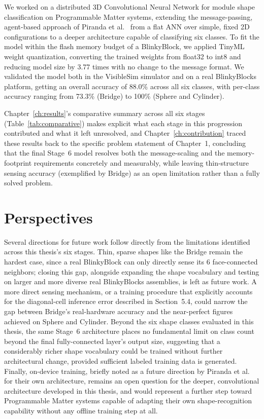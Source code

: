 \documentclass[12pt,a4paper]{report}
\begin{document}
We worked on a distributed 3D Convolutional Neural Network for module shape classification on Programmable Matter systems, extending the message-passing, agent-based approach of Piranda et al.~\cite{piranda2024ai4pm} from a flat ANN over simple, fixed 2D configurations to a deeper architecture capable of classifying six classes. To fit the model within the flash memory budget of a BlinkyBlock, we applied TinyML weight quantization, converting the trained weights from float32 to int8 and reducing model size by 3.77 times with no change to the message format. We validated the model both in the VisibleSim simulator and on a real BlinkyBlocks platform, getting an overall accuracy of 88.0\% across all six classes, with per-class accuracy ranging from 73.3\% (Bridge) to 100\% (Sphere and Cylinder).

Chapter~\ref{ch:results}'s comparative summary across all six stages (Table~\ref{tab:comparative}) makes explicit what each stage in this progression contributed and what it left unresolved, and Chapter~\ref{ch:contribution} traced these results back to the specific problem statement of Chapter~1, concluding that the final Stage~6 model resolves both the message-scaling and the memory-footprint requirements concretely and measurably, while leaving thin-structure sensing accuracy (exemplified by Bridge) as an open limitation rather than a fully solved problem.

\section{Perspectives}

Several directions for future work follow directly from the limitations identified across this thesis's six stages. Thin, sparse shapes like the Bridge remain the hardest case, since a real BlinkyBlock can only directly sense its 6 face-connected neighbors; closing this gap, alongside expanding the shape vocabulary and testing on larger and more diverse real BlinkyBlocks assemblies, is left as future work. A more direct sensing mechanism, or a training procedure that explicitly accounts for the diagonal-cell inference error described in Section~5.4, could narrow the gap between Bridge's real-hardware accuracy and the near-perfect figures achieved on Sphere and Cylinder. Beyond the six shape classes evaluated in this thesis, the same Stage~6 architecture places no fundamental limit on class count beyond the final fully-connected layer's output size, suggesting that a considerably richer shape vocabulary could be trained without further architectural change, provided sufficient labeled training data is generated. Finally, on-device training, briefly noted as a future direction by Piranda et al.~\cite{piranda2024ai4pm} for their own architecture, remains an open question for the deeper, convolutional architecture developed in this thesis, and would represent a further step toward Programmable Matter systems capable of adapting their own shape-recognition capability without any offline training step at all.
\end{document}
